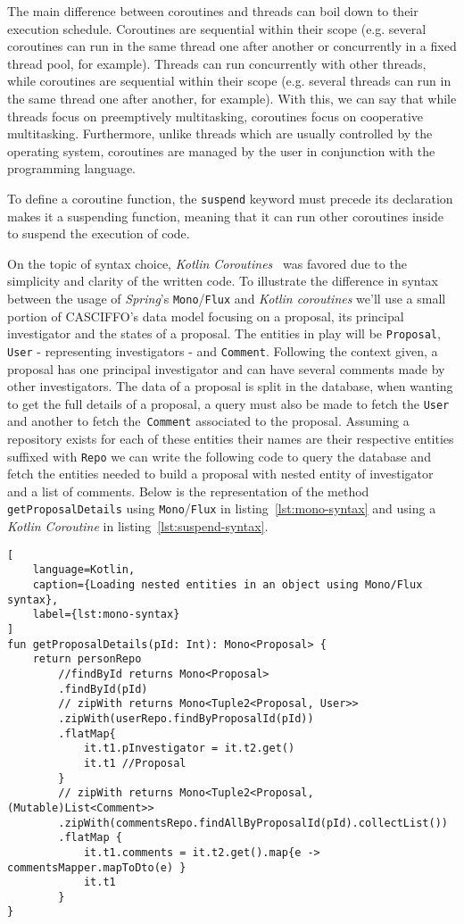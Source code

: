 The main difference between coroutines and threads can boil down to their execution schedule. Coroutines are sequential within their scope (e.g. several coroutines can run in the same thread one after another or concurrently in a fixed thread pool, for example). Threads can run concurrently with other threads, while coroutines are sequential within their scope (e.g. several threads can run in the same thread one after another, for example). 
With this, we can say that while threads focus on preemptively multitasking, coroutines focus on cooperative multitasking. 
Furthermore, unlike threads which are usually controlled by the operating system, coroutines are managed by the user in conjunction with the programming language. 

To define a coroutine function, the \texttt{suspend} keyword must precede its declaration makes it a suspending function, meaning that it can run other coroutines inside to suspend the execution of code. 

On the topic of syntax choice, \textit{Kotlin Coroutines}~\cite{kotlin-coroutines} was favored due to the simplicity and clarity of the written code.
To illustrate the difference in syntax between the usage of \textit{Spring}'s \texttt{Mono}/\texttt{Flux} and \textit{Kotlin coroutines} we'll use a small portion of CASCIFFO's data model focusing on a proposal, its principal investigator and the states of a proposal. The entities in play will be \texttt{Proposal}, \texttt{User} - representing investigators - and \texttt{Comment}. Following the context given, a proposal has one principal investigator and can have several comments made by other investigators. The data of a proposal is split in the database, when wanting to get the full details of a proposal, a query must also be made to fetch the \texttt{User} and another to fetch the~\texttt{Comment} associated to the proposal. Assuming a repository exists for each of these entities their names are their respective entities suffixed with \texttt{Repo} we can write the following code to query the database and fetch the entities needed to build a proposal with nested entity of investigator and a list of comments.
Below is the representation of the method \texttt{getProposalDetails} using \texttt{Mono}/\texttt{Flux} in listing~\ref{lst:mono-syntax} and using a \textit{Kotlin Coroutine} in listing~\ref{lst:suspend-syntax}.

\begin{lstlisting}[
    language=Kotlin, 
    caption={Loading nested entities in an object using Mono/Flux syntax}, 
    label={lst:mono-syntax}
]
fun getProposalDetails(pId: Int): Mono<Proposal> {
    return personRepo
        //findById returns Mono<Proposal>
        .findById(pId) 
        // zipWith returns Mono<Tuple2<Proposal, User>>
        .zipWith(userRepo.findByProposalId(pId)) 
        .flatMap{ 
            it.t1.pInvestigator = it.t2.get()
            it.t1 //Proposal
        }
        // zipWith returns Mono<Tuple2<Proposal, (Mutable)List<Comment>>
        .zipWith(commentsRepo.findAllByProposalId(pId).collectList()) 
        .flatMap {
            it.t1.comments = it.t2.get().map{e ->  commentsMapper.mapToDto(e) }
            it.t1
        }
}    
\end{lstlisting}


